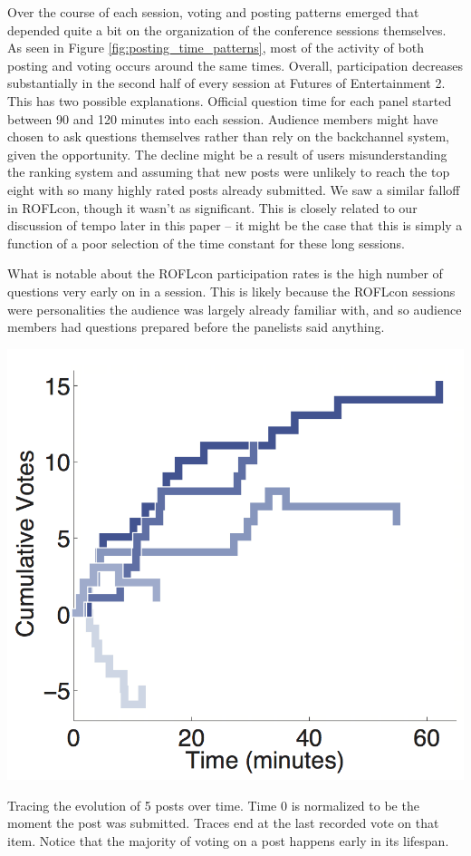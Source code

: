 Over the course of each session, voting and posting patterns emerged that depended quite a bit on the organization of the conference sessions themselves. As seen in Figure \ref{fig:posting_time_patterns}, most of the activity of both posting and voting occurs around the same times. Overall, participation decreases substantially in the second half of every session at Futures of Entertainment 2. This has two possible explanations. Official question time for each panel started between 90 and 120 minutes into each session. Audience members might have chosen to ask questions themselves rather than rely on the backchannel system, given the opportunity. The decline might be a result of users misunderstanding the ranking system and assuming that new posts were unlikely to reach the top eight with so many highly rated posts already submitted. We saw a similar falloff in ROFLcon, though it wasn't as significant. This is closely related to our discussion of tempo later in this paper – it might be the case that this is simply a function of a poor selection of the time constant for these long sessions. 

What is notable about the ROFLcon participation rates is the high number of questions very early on in a session. This is likely because the ROFLcon sessions were personalities the audience was largely already familiar with, and so audience members had questions prepared before the panelists said anything.

\begin{marginfigure}
	\includegraphics{figures/backchannl/cumulative_vote_histories_colors.png}
	\caption{Tracing the evolution of 5 posts over time. Time 0 is normalized to be the moment the post was submitted. Traces end at the last recorded vote on that item. Notice that the majority of voting on a post happens early in its lifespan.}
	\label{fig:post_score_evolution}
\end{marginfigure}

